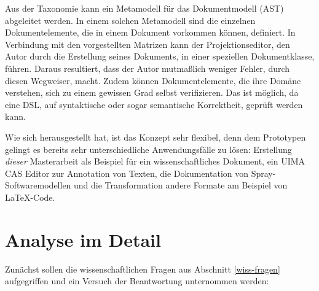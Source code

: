  
Aus der Taxonomie kann ein Metamodell für das Dokumentmodell (AST) abgeleitet werden. In einem solchen Metamodell sind die einzelnen Dokumentelemente, die in einem Dokument vorkommen können, definiert. In Verbindung mit den vorgestellten Matrizen kann der Projektionseditor, den Autor durch die Erstellung seines Dokuments, in einer speziellen Dokumentklasse, führen. Daraus resultiert, dass der Autor mutmaßlich weniger Fehler, durch diesen Wegweiser, macht. Zudem können Dokumentelemente, die ihre Domäne verstehen, sich zu einem gewissen Grad selbst verifizieren. Das ist möglich, da eine DSL, auf syntaktische oder sogar semantische Korrektheit, geprüft werden kann.

 
Wie sich herausgestellt hat, ist das Konzept sehr flexibel, denn dem Prototypen gelingt es bereits sehr unterschiedliche Anwendungsfälle zu lösen: Erstellung \emph{dieser} Masterarbeit als Beispiel für ein wissenschaftliches Dokument, ein UIMA CAS Editor zur Annotation von Texten, die Dokumentation von Spray-Softwaremodellen und die Transformation andere Formate am Beispiel von LaTeX-Code.

 
\section{Analyse im Detail}\label{}
 
Zunächst sollen die wissenschaftlichen Fragen aus Abschnitt \ref{wiss-fragen} aufgegriffen und  ein Versuch der Beantwortung unternommen werden:

